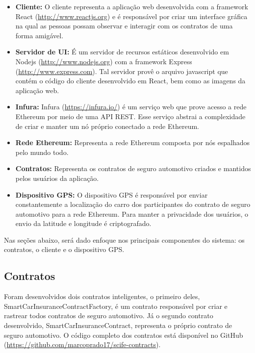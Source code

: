 \begin{itemize}
	\item \textbf{Cliente:} O cliente representa a aplicação web desenvolvida com a framework React (\href{http://www.reactjs.org}{http://www.reactjs.org}) e é responsável por criar um interface gráfica na qual as pessoas possam observar e interagir com os contratos de uma forma amigável.
    \item \textbf{Servidor de UI:} É um servidor de recursos estáticos desenvolvido em Nodejs (\href{http://www.nodejs.org}{http://www.nodejs.org}) com a framework Express (\href{http://www.express.com}{http://www.express.com}). Tal servidor provê o arquivo javascript que contém o código do cliente desenvolvido em React, bem como as imagens da aplicação web.
    \item \textbf{Infura:} Infura (\href{https://infura.io/}{https://infura.io/}) é um serviço web que prove acesso a rede Ethereum por meio de uma API REST. Esse serviço abstrai a complexidade de criar e manter um nó próprio conectado a rede Ethereum.
    \item \textbf{Rede Ethereum:} Representa a rede Ethereum composta por nós espalhados pelo mundo todo.
    \item \textbf{Contratos:} Representa os contratos de seguro automotivo criados e mantidos pelos usuários da aplicação.
    \item \textbf{Dispositivo GPS:} O dispositivo GPS é responsável por enviar constantemente a localização do carro dos participantes do contrato de seguro automotivo para a rede Ethereum. Para manter a privacidade dos usuários, o envio da latitude e longitude é criptografado.
\end{itemize}

Nas seções abaixo, será dado enfoque nos principais componentes do sistema: os contratos, o cliente e o dispositivo GPS.

\subsection{Contratos}

Foram desenvolvidos dois contratos inteligentes, o primeiro deles, SmartCarInsuranceContractFactory, é um contrato responsável por criar e rastrear todos contratos de seguro automotivo. Já o segundo contrato desenvolvido, SmartCarInsuranceContract, representa o próprio contrato de seguro automotivo. O código completo dos contratos está disponível no GitHub (\href{https://github.com/marcoprado17/scife-contracts}{https://github.com/marcoprado17/scife-contracts}).

